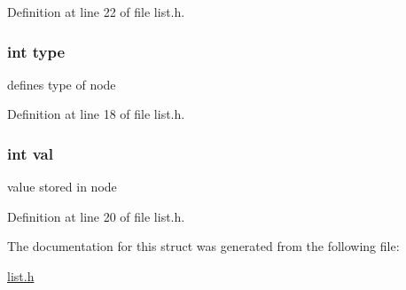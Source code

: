 Definition at line 22 of file list.\-h.

\hypertarget{structwllc_ac765329451135abec74c45e1897abf26}{
\subsubsection[{type}]{\setlength{\rightskip}{0pt plus 5cm}int type}}\label{structwllc_ac765329451135abec74c45e1897abf26}
defines type of node 

Definition at line 18 of file list.\-h.

\hypertarget{structwllc_aa0ccb5ee6d882ee3605ff47745c6467b}{
\subsubsection[{val}]{\setlength{\rightskip}{0pt plus 5cm}int val}}\label{structwllc_aa0ccb5ee6d882ee3605ff47745c6467b}
value stored in node 

Definition at line 20 of file list.\-h.



The documentation for this struct was generated from the following file\-:\begin{DoxyCompactItemize}
\item 
\hyperlink{list_8h}{list.\-h}\end{DoxyCompactItemize}
